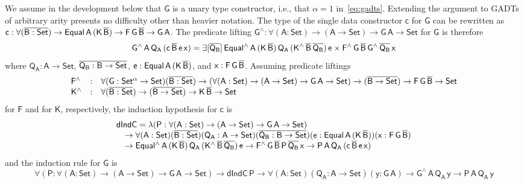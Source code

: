 \documentclass[9pt]{entcs}
\begin{document}
We assume in the development below that $\mathsf{G}$ is a unary type
constructor, i.e., that $\alpha = 1$ in~\eqref{eq:gadts}. Extending
the argument to GADTs of arbitrary arity presents no difficulty other
than heavier notation. The type of the single data constructor
$\mathsf{c}$ for $\mathsf{G}$ can be rewritten as $\mathsf{c : \forall
  (\overline{B : Set}) \to Equal\,A\,(K\,\overline{B}) \to F\,G\,\overline{B} \to
  G\,A}$. The predicate lifting $\mathsf{G^{\wedge} : \forall (A :
  Set) \to (A \to Set) \to G\,A \to Set}$ for $\mathsf{G}$ is
therefore
\[
\mathsf{G^{\wedge}\,A\,Q_A\,(c\,\overline{B}\,e\,x)
= \exists [\overline{Q_B}]\,
Equal^{\wedge}\,A\,(K\,\overline{B})\,Q_A\,(K^{\wedge}\,\overline{B}\,\overline{Q_B})\,e
\times F^{\wedge}\,G\,\overline{B}\,G^{\wedge}\,{\overline{Q_B}}\,x}
\]
where $\mathsf{Q_A : A \to Set}$, $\overline{\mathsf{Q_B : B \to Set}}$,
$\mathsf{e : Equal\,A\,(K\,\overline{B})}$, and $\mathsf{x : F\,G\,\overline{B}}$.
Assuming predicate liftings 
\[\begin{array}{lll}
\mathsf{F^{\wedge}} & : & \mathsf{\forall (G : Set^{\alpha} \to Set) (\overline{B : Set})
\to (\forall (A : Set) \to (A \to Set) \to G\,A \to Set)
\to (\overline{B \to Set}) \to F\,G\,\overline{B} \to Set}\\ 
\mathsf{K^{\wedge}} & : & \mathsf{\forall (\overline{B : Set}) \to (\overline{B \to Set}) \to
  K\,\overline{B} \to Set}
\end{array}\]
for $\mathsf{F}$ and for $\mathsf{K}$, respectively, the induction
hypothesis for $\mathsf{c}$ is
\[\begin{array}{l}
\mathsf{dIndC = \lambda (P : \forall (A : Set) \to (A \to Set) \to
  G\,A \to Set)}\\
\quad \mathsf{\to \forall (A : Set) (\overline{B : Set}) (Q_A : A \to Set)
  (\overline{Q_B : B \to Set}) (e : Equal\,A\,(K\,\overline{B})) (x :
  F\,G\,\overline{B})} \\ 
\quad \mathsf{\to
  Equal^{\wedge}\,A\,(K\,\overline{B})\,Q_A\,(K^{\wedge}\,\overline{B}\,\overline{Q_B})\,e
  \to F^{\wedge}\,G\,\overline{B}\,P\,\overline{Q_B}\,x \to
  P\,A\,Q_A\,(c\,\overline{B}\,e\,x)} 
\end{array}\]
and the induction rule for $\mathsf{G}$ is
\[
\mathsf{\forall (P : \forall (A : Set) \to (A \to Set) \to G\,A \to
  Set) \to dIndC\,P \to \forall (A : Set)(Q_A : A \to Set)(y : G\,A)
\to G^{\wedge}\,A\,Q_A\,y \to P\,A\,Q_A\,y} \]
\end{document}
